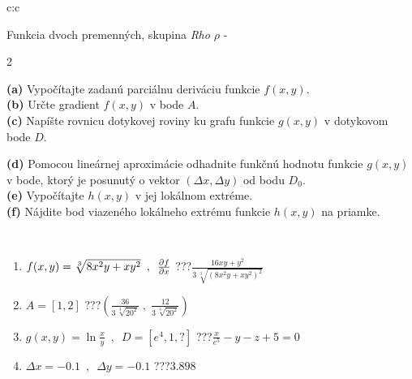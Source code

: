 \documentclass[10pt]{report}
\begin{document}
\begin{tabular}{c:c}
\begin{minipage}[c][104.5mm][t]{0.5\linewidth}
\begin{center}
\vspace{7mm}
{\huge \LARGE Funkcia dvoch premenných, skupina \textit{Rho $\rho$} -}\\[5mm]
\begin{minipage}{0.95\linewidth}
\begin{center}
{\small \begin{multicols}{2} \raggedright
\textbf{(a)} Vypočítajte zadanú parciálnu deriváciu funkcie \(f(x,y)\). \\[1mm]
\textbf{(b)} Určte gradient \(f(x,y)\) v bode \(A\). \\[1mm]
\textbf{(c)} Napíšte rovnicu dotykovej roviny ku grafu funkcie \(g(x,y)\) v dotykovom bode \(D\). \par \columnbreak
\textbf{(d)} Pomocou lineárnej aproximácie odhadnite funkčnú hodnotu funkcie \(g(x,y)\) v bode, ktorý je posunutý o vektor \((\Delta x, \Delta y)\) od bodu \(D_0\). \\[1mm]
\textbf{(e)} Vypočítajte \(h(x,y)\) v jej lokálnom extréme. \\[1mm]
\textbf{(f)} Nájdite bod viazeného lokálneho extrému funkcie \(h(x,y)\) na priamke. \\[1mm]
\end{multicols}
}
\end{center}
\end{minipage}
\\[4mm]
\begin{minipage}{0.79\linewidth}
\begin{center}
\begin{varwidth}{\linewidth}
\begin{enumerate}
\normalsizerr
\item $f(x,y) = \sqrt[3]{8x^2y + xy^2}\enspace , \enspace \pdv{f}{x}$\quad \dotfill\; ???\;\dotfill \quad $\frac{16xy+y^2}{3\,\sqrt[3]{(8x^2y+xy^2)^{2}}}$
\item $A = [1, 2]$\quad \dotfill\; ???\;\dotfill \quad $\left( \frac{36}{3\,\sqrt[3]{20^2}} \;,\; \frac{12}{3\,\sqrt[3]{20^2}} \right)$
\item $g(x,y) = \ln\frac{x}{y} \enspace , \enspace D=[e^{4},1,?]$\quad \dotfill\; ???\;\dotfill \quad $\frac{x}{e^5} - y - z + 5 = 0$
\item $\Delta x = {-0.1} \enspace,\enspace \Delta y = {-0.1}$\quad \dotfill\; ???\;\dotfill \quad $3.898$

\end{enumerate}
\end{varwidth}
\end{center}
\end{minipage}
\end{center}
\end{minipage}
\end{tabular}
\end{document}
